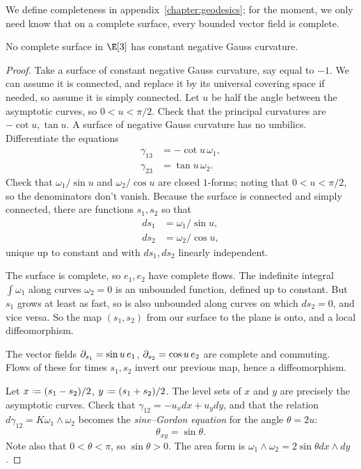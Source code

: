 We define completeness in appendix~\ref{chapter:geodesics}; for the moment, we only need know that on a complete surface, every bounded vector field is complete. 
\begin{theorem}[Hilbert]
No complete surface in \(\E[3]\) has constant negative Gauss curvature.
\end{theorem}
\begin{proof}
Take a surface of constant negative Gauss curvature, say equal to \(-1\).
We can assume it is connected, and replace it by its universal covering space if needed, so assume it is simply connected.
Let \(u\) be half the angle between the asymptotic curves, so \(0<u<\pi/2\).
Check that the principal curvatures are \(-\cot u,\tan u\).
A surface of negative Gauss curvature has no umbilics.
Differentiate the equations 
\begin{align*}
\gamma_{13}&=-\cot u \, \omega_1,\\
\gamma_{23}&=\tan u \, \omega_2.
\end{align*}
Check that \(\omega_1/\sin u\) and \(\omega_2/\cos u\) are closed \(1\)-forms; noting that \(0 < u < \pi/2\), so the denominators don't vanish.
Because the surface is connected and simply connected, there are functions \(s_1,s_2\) so that 
\begin{align*}
ds_1&=\omega_1/\sin u,\\
ds_2&=\omega_2/\cos u,
\end{align*}
unique up to constant and with \(ds_1,ds_2\) linearly independent.

The surface is complete, so \(e_1,e_2\) have complete flows.
The indefinite integral \(\int \omega_1\) along curves \(\omega_2=0\) is an unbounded function, defined up to constant.
But \(s_1\) grows at least as fast, so is also unbounded along curves on which \(ds_2=0\), and vice versa.
So the map \((s_1,s_2)\) from our surface to the plane is onto, and a local diffeomorphism.

The vector fields \(\partial_{s_1}=\sin u \, e_1\), \(\partial_{s_2}=\cos u \, e_2\) are complete and commuting.
Flows of these for times \(s_1,s_2\) invert our previous map, hence a diffeomorphism.

Let \(x\defeq(s_1-s_2)/2\), \(y\defeq(s_1+s_2)/2\).
The level sets of \(x\) and \(y\) are precisely the asymptotic curves.
Check that \(\gamma_{12}=-u_xdx+u_ydy\), and that the relation \(d\gamma_{12}=K\omega_1\wedge\omega_2\) becomes the \emph{sine--Gordon equation} for the angle \(\theta=2u\):
\[
\theta_{xy}=\sin\theta.
\]
Note also that \(0<\theta<\pi\), so \(\sin\theta>0\).
The area form is \(\omega_1\wedge\omega_2=2\sin \theta dx \wedge dy\).


\end{proof}
